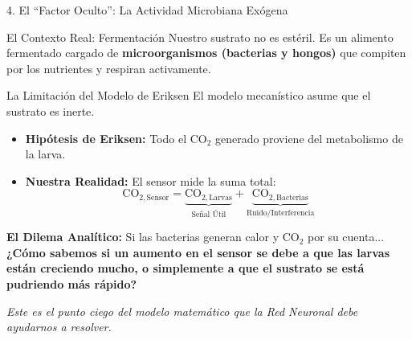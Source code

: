 \documentclass[aspectratio=169, 10pt]{beamer}
\begin{document}
\begin{frame}{4. El ``Factor Oculto'': La Actividad Microbiana Exógena}

    \begin{block}{El Contexto Real: Fermentación}
        Nuestro sustrato no es estéril. Es un alimento fermentado cargado de \textbf{microorganismos (bacterias y hongos)} que compiten por los nutrientes y respiran activamente.
    \end{block}

    \vspace{0.2cm}

    \begin{alertblock}{La Limitación del Modelo de Eriksen}
        El modelo mecanístico asume que el sustrato es inerte.
        \begin{itemize}
            \item \textbf{Hipótesis de Eriksen:} Todo el CO$_2$ generado proviene del metabolismo de la larva.
            \item \textbf{Nuestra Realidad:} El sensor mide la suma total:
            $$ \text{CO}_{2,\text{Sensor}} = \underbrace{\text{CO}_{2,\text{Larvas}}}_{\text{Señal Útil}} + \underbrace{\text{CO}_{2,\text{Bacterias}}}_{\text{Ruido/Interferencia}} $$
        \end{itemize}
    \end{alertblock}

    \vspace{0.2cm}

    \textbf{El Dilema Analítico:}
    Si las bacterias generan calor y CO$_2$ por su cuenta... \textbf{¿Cómo sabemos si un aumento en el sensor se debe a que las larvas están creciendo mucho, o simplemente a que el sustrato se está pudriendo más rápido?}

    \vspace{0.2cm}
    \textit{Este es el punto ciego del modelo matemático que la Red Neuronal debe ayudarnos a resolver.}
\end{frame}
\end{document}
